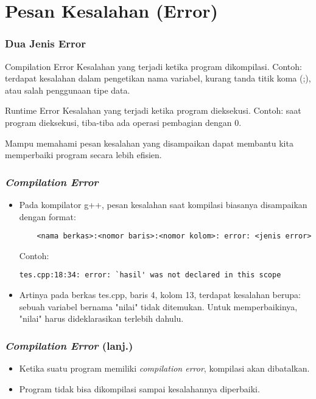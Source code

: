 \section{Pesan Kesalahan (Error)}
\frame{\sectionpage}

\begin{frame}
\frametitle{Dua Jenis Error}
\begin{block}{Compilation Error}
  Kesalahan yang terjadi ketika program dikompilasi.\newline
  Contoh: terdapat kesalahan dalam pengetikan nama variabel, kurang tanda titik koma (;), atau salah penggunaan tipe data.
\end{block}
\begin{block}{Runtime Error}
  Kesalahan yang terjadi ketika program dieksekusi.\newline
  Contoh: saat program dieksekusi, tiba-tiba ada operasi pembagian dengan 0.
\end{block}

Mampu memahami pesan kesalahan yang disampaikan dapat membantu kita memperbaiki program secara lebih efisien.
\end{frame}

\begin{frame}[fragile]
\frametitle{\textit{Compilation Error}}
\begin{itemize}
  \item Pada kompilator g++, pesan kesalahan saat kompilasi biasanya disampaikan dengan format:
  \begin{lstlisting}
    <nama berkas>:<nomor baris>:<nomor kolom>: error: <jenis error>
  \end{lstlisting}
  Contoh:
  \begin{lstlisting}[language={}]
    tes.cpp:18:34: error: `hasil' was not declared in this scope
  \end{lstlisting}
  \item Artinya pada berkas tes.cpp, baris 4, kolom 13, terdapat kesalahan berupa: sebuah variabel bernama "nilai" tidak ditemukan. Untuk memperbaikinya, "nilai" harus dideklarasikan terlebih dahulu.
\end{itemize}
\end{frame}

\begin{frame}[fragile]
\frametitle{\textit{Compilation Error} (lanj.)}
\begin{itemize}
  \item Ketika suatu program memiliki \textit{compilation error}, kompilasi akan dibatalkan.
  \item Program tidak bisa dikompilasi sampai kesalahannya diperbaiki.
\end{itemize}
\end{frame}

